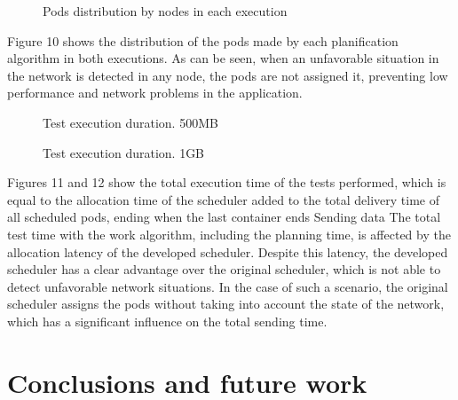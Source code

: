 \documentclass[conference]{IEEEtran}
\begin{document}
\begin{figure}[h]
\begin{center}
\strut{}
\caption{Pods distribution by nodes in each execution}\label{fig:cluster}
\end{center}
\end{figure}


Figure 10 shows the distribution of the pods made by each planification algorithm in both executions. As can be seen, when an unfavorable situation in the network is detected in any node, the pods are not assigned it, preventing low performance and network problems in the application.

\begin{figure}[h]
\begin{center}
\strut{}
\caption{Test execution duration. 500MB}\label{fig:cluster}
\end{center}
\end{figure}

\begin{figure}[h]
\begin{center}
\strut{}
\caption{Test execution duration. 1GB}\label{fig:cluster}
\end{center}
\end{figure}

Figures 11 and 12 show the total execution time of the tests performed, which is equal to the allocation time of the scheduler added to the total delivery time of all scheduled pods, ending when the last container ends Sending data The total test time with the work algorithm, including the planning time, is affected by the allocation latency of the developed scheduler. Despite this latency, the developed scheduler has a clear advantage over the original scheduler, which is not able to detect unfavorable network situations. In the case of such a scenario, the original scheduler assigns the pods without taking into account the state of the network, which has a significant influence on the total sending time.

\section{Conclusions and future work}\label{sec:conc}
\end{document}
